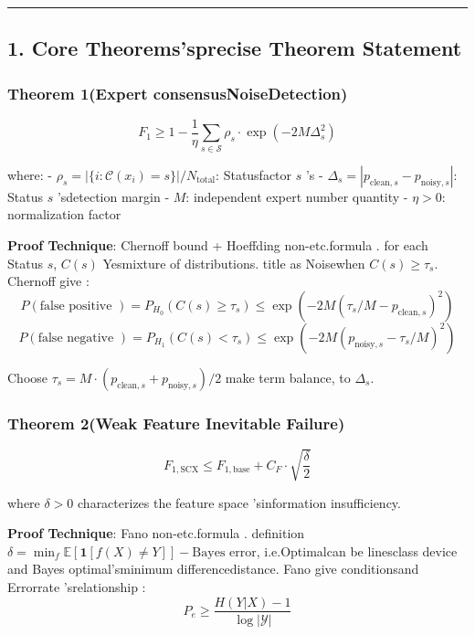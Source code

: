 \documentclass[
  12pt,
]{article}
\begin{document}
\begin{center}\rule{0.5\linewidth}{0.5pt}\end{center}

\subsection{1.
Core Theorems'sprecise Theorem Statement}\label{ux6838ux5fc3ux5b9aux7406ux7684ux7cbeux786eux5b9aux7406ux9648ux8ff0}

\subsubsection{Theorem
1(Expert consensusNoiseDetection)}\label{theorem-1ux591aux4e13ux5bb6ux4e00ux81f4ux6027ux566aux58f0ux68c0ux6d4b}

\[\boxed{F_1 \geq 1 - \frac{1}{\eta} \sum_{s \in \mathcal{S}} \rho_s \cdot \exp\left(-2M \Delta_s^2\right)}\]

where:  -
\(\rho_s = |\{i: \mathcal{C}(x_i) = s\}| / N_{\text{total}}\): Statusfactor 
\(s\) 's -
\(\Delta_s = |p_{\text{clean},s} - p_{\text{noisy},s}|\): Status \(s\)
'sdetection margin - \(M\): independent expert number quantity  - \(\eta > 0\): normalization factor 

\textbf{Proof Technique}: Chernoff bound + Hoeffding non-etc.formula . for each Status
\(s\), \(C(s)\) Yesmixture of distributions. title as Noisewhen 
\(C(s) \geq \tau_s\). Chernoff give : 
\[P(\text{false positive }) = P_{H_0}(C(s) \geq \tau_s) \leq \exp(-2M(\tau_s/M - p_{\text{clean},s})^2)\]
\[P(\text{false negative }) = P_{H_1}(C(s) < \tau_s) \leq \exp(-2M(p_{\text{noisy},s} - \tau_s/M)^2)\]

Choose \(\tau_s = M \cdot (p_{\text{clean},s} + p_{\text{noisy},s})/2\)
make term balance, to  \(\Delta_s\). 

\subsubsection{Theorem
2(Weak Feature Inevitable Failure)}\label{theorem-2ux5f31ux7279ux5f81ux5fc5ux7136ux5931ux6548}

\[\boxed{F_{1,\text{SCX}} \leq F_{1,\text{base}} + C_F \cdot \sqrt{\frac{\delta}{2}}}\]

where \(\delta > 0\) characterizes the feature space 'sinformation insufficiency. 

\textbf{Proof Technique}: Fano non-etc.formula . definition 
\(\delta = \min_{f} \mathbb{E}[\mathbf{1}[f(X) \neq Y]] - \text{Bayes error}\), i.e.Optimalcan be linesclass device and Bayes optimal'sminimum differencedistance. Fano
give conditionsand Errorrate 'srelationship : 
\[P_e \geq \frac{H(Y|X) - 1}{\log |\mathcal{Y}|}\]
\end{document}
